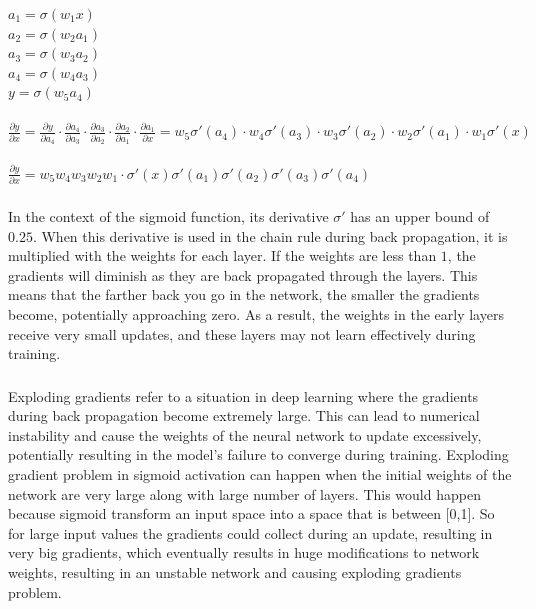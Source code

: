 \subsubsection{}
$a_{1} = \sigma(w_{1}x)$\\
$a_{2} = \sigma(w_{2}a_{1})$\\
$a_{3} = \sigma(w_{3}a_{2})$\\
$a_{4} = \sigma(w_{4}a_{3})$\\
$y = \sigma(w_{5}a_{4})$\\\\
$\frac{\partial y}{\partial x} = \frac{\partial y}{\partial a_{4}} \cdot \frac{\partial a_{4}}{\partial a_{3}} \cdot \frac{\partial a_{3}}{\partial a_{2}} \cdot \frac{\partial a_{2}}{\partial a_{1}} \cdot \frac{\partial a_{1}}{\partial x} = w_{5}\sigma'(a_{4}) \cdot w_{4}\sigma'(a_{3}) \cdot w_{3}\sigma'(a_{2}) \cdot w_{2}\sigma'(a_{1}) \cdot w_{1}\sigma'(x)$\\\\
$\frac{\partial y}{\partial x} = w_{5}w_{4}w_{3}w_{2}w_{1} \cdot \sigma'(x)\sigma'(a_{1})\sigma'(a_{2})\sigma'(a_{3})\sigma'(a_{4})$
\subsubsection{}
In the context of the sigmoid function, its derivative $\sigma'$ has an upper bound of $0.25$. When this derivative is used in the chain rule during back propagation, it is multiplied with the weights for each layer. If the weights are less than $1$, the gradients will diminish as they are back propagated through the layers. This means that the farther back you go in the network, the smaller the gradients become, potentially approaching zero. As a result, the weights in the early layers receive very small updates, and these layers may not learn effectively during training.
\subsubsection{}
Exploding gradients refer to a situation in deep learning where the gradients during back propagation become extremely large. This can lead to numerical instability and cause the weights of the neural network to update excessively, potentially resulting in the model's failure to converge during training. 
Exploding gradient problem in sigmoid activation can happen when the initial weights of the network are very large along with large number of layers. This would happen because sigmoid transform an input space into a space that is between [0,1]. So for large input values the gradients could collect during an update, resulting in very big gradients, which eventually results in huge modifications to network weights, resulting in an unstable network and causing exploding gradients problem.


